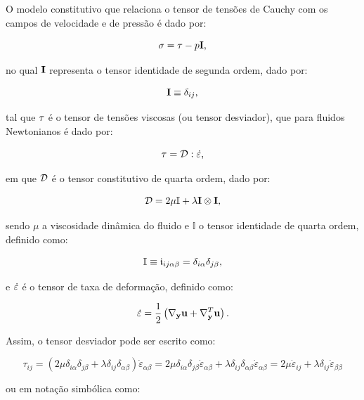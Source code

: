 \documentclass[_ArquivoPrincipal.tex]{subfiles}
\begin{document}
O modelo constitutivo que relaciona o tensor de tensões de Cauchy com os campos de velocidade e de pressão é dado por:

\begin{equation}
    \mathbf{\sigma}=\mathbf{\tau}-p\mathbf{I}\text{,}\label{eq:const1}
\end{equation}

\noindent no qual $\mathbf{I}$ representa o tensor identidade de segunda ordem, dado por:

\begin{equation}
    \mathbf{I}\equiv\delta_{ij}\text{,}
\end{equation}

\noindent tal que $\mathbf{\tau}$ é o tensor de tensões viscosas (ou tensor desviador), que para fluidos Newtonianos é dado por:

\begin{equation}
    \mathbf{\tau}=\mathcal{D}:\dot{\mathbf{\varepsilon}}\text{,}
\end{equation}

\noindent em que $\mathcal{D}$ é o tensor constitutivo de quarta ordem, dado por:

\begin{equation}
    \mathcal{D}=2\mu\mathbb{I}+\lambda\mathbf{I}\otimes\mathbf{I}\text{,}
\end{equation}

\noindent sendo $\mu$ a viscosidade dinâmica do fluido e $\mathbb{I}$ o tensor identidade de quarta ordem, definido como:

\begin{equation}
    \mathbb{I}\equiv\frak{i}_{ij\alpha\beta}=\delta_{i\alpha}\delta_{j\beta}\text{,}
\end{equation}

\noindent e $\dot{\mathbf{\varepsilon}}$ é o tensor de taxa de deformação, definido como:

\begin{equation}
    \dot{\mathbf{\varepsilon}}=\frac{1}{2}\left(\mathbf{\nabla_y}\mathbf{u}+\mathbf{\nabla}^T_\mathbf{y}\mathbf{u}\right)\text{.}\label{eq:deftax1}
\end{equation}

Assim, o tensor desviador pode ser escrito como:

\[\tau_{ij}=(2\mu\delta_{i\alpha}\delta_{j\beta}+\lambda\delta_{ij}\delta_{\alpha\beta})\dot{\varepsilon}_{\alpha\beta}=2\mu\delta_{i\alpha}\delta_{j\beta}\dot{\varepsilon}_{\alpha\beta}+\lambda\delta_{ij}\delta_{\alpha\beta}\dot{\varepsilon}_{\alpha\beta}=2\mu\dot{\varepsilon}_{ij}+\lambda\delta_{ij}\dot{\varepsilon}_{\beta\beta}\]

\noindent ou em notação simbólica como:
\end{document}
